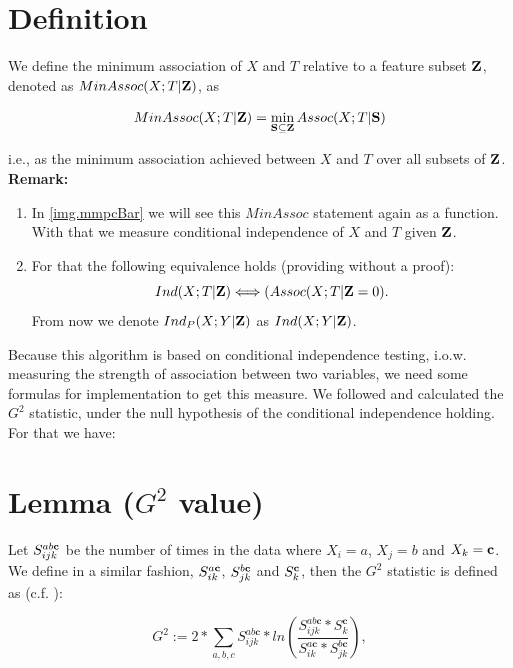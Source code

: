 	\section*{Definition} \label{s.Def9}

		We define the minimum association of $X$ and $T$ relative to a feature subset ${\textbf{Z}}$, denoted as $MinAssoc(X; T | {\textbf{Z}})$, as

		\begin{equation}
			MinAssoc (X; T | {\textbf{Z}}) = \min_{{\textbf{S}} \subseteq {\textbf{Z}}} Assoc(X; T | {\textbf{S}})
		\end{equation}

		i.e., as the minimum association achieved between $X$ and $T$ over all subsets of ${\textbf{Z}}$. \\
		\textbf{Remark:}
		\begin{enumerate}
			\item In \autoref{img.mmpcBar} we will see this $MinAssoc$ statement again as a function. With that we measure conditional independence of $X$ and $T$ given ${\textbf{Z}}$.
			\item For that the following equivalence holds (providing without a proof): 
				\begin{equation}
					Ind(X; T | {\textbf{Z}}) \Longleftrightarrow (Assoc(X; T | {\textbf{Z}} = 0).
				\end{equation}
				From now we denote $Ind_{P}(X; Y | {\textbf{Z}})$ as $Ind(X; Y | {\textbf{Z}})$.
		\end{enumerate}

	Because this algorithm is based on conditional independence testing, i.o.w. measuring the strength of association between two variables, we need some formulas for implementation to get this measure. We followed \cite{SGSN} and calculated the $G^{2}$ statistic, under the null hypothesis of the conditional independence holding. For that we have:\\

	\section*{Lemma ($G^{2}$ value)} \label{s.g2}

		Let $S_{ijk}^{ab{\textbf{c}}}$ be the number of times in the data where $X_{i} = a$, $X_{j} = b$ and $X_{k} = {\textbf{c}}$. We define in a similar fashion, $S_{ik}^{a{\textbf{c}}}$, $S_{jk}^{b{\textbf{c}}}$  and $S_{k}^{{\textbf{c}}}$, then the $G^{2}$ statistic is defined as (c.f. \cite{SGSN}):

		\begin{equation}
			G^{2} := 2 * \sum_{a,b,c} S^{ab\textbf{c}}_{ijk} * ln \left( \frac{S^{ab\textbf{c}}_{ijk}*S^{\textbf{c}}_{k}}{S^{a\textbf{c}}_{ik}*S^{b\textbf{c}}_{jk}} \right),
		\end{equation}

